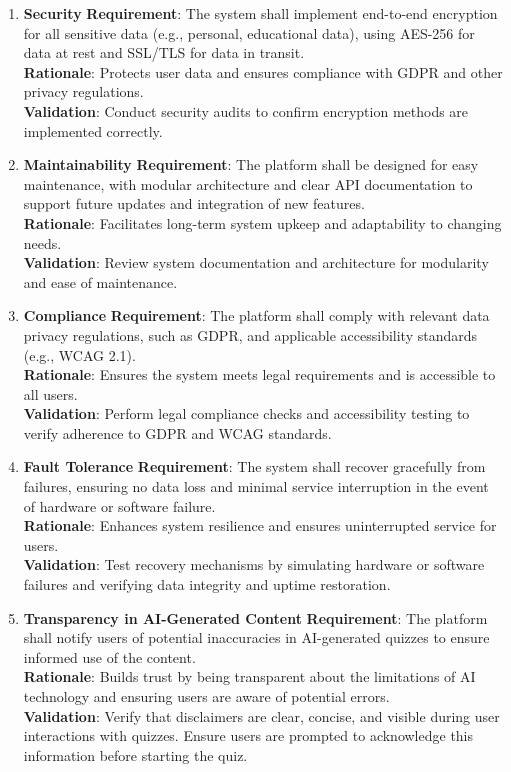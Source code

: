 \documentclass[12pt]{article}
\begin{document}
\begin{enumerate}
    \item \textbf{Security}  
    \textbf{Requirement}: The system shall implement end-to-end encryption for all sensitive data (e.g., personal, educational data), using AES-256 for data at rest and SSL/TLS for data in transit. \\
    \textbf{Rationale}: Protects user data and ensures compliance with GDPR and other privacy regulations. \\
    \textbf{Validation}: Conduct security audits to confirm encryption methods are implemented correctly.

    \item \textbf{Maintainability}  
    \textbf{Requirement}: The platform shall be designed for easy maintenance, with modular architecture and clear API documentation to support future updates and integration of new features. \\
    \textbf{Rationale}: Facilitates long-term system upkeep and adaptability to changing needs. \\
    \textbf{Validation}: Review system documentation and architecture for modularity and ease of maintenance.

    \item \textbf{Compliance}  
    \textbf{Requirement}: The platform shall comply with relevant data privacy regulations, such as GDPR, and applicable accessibility standards (e.g., WCAG 2.1). \\
    \textbf{Rationale}: Ensures the system meets legal requirements and is accessible to all users. \\
    \textbf{Validation}: Perform legal compliance checks and accessibility testing to verify adherence to GDPR and WCAG standards.

    \item \textbf{Fault Tolerance}  
    \textbf{Requirement}: The system shall recover gracefully from failures, ensuring no data loss and minimal service interruption in the event of hardware or software failure. \\
    \textbf{Rationale}: Enhances system resilience and ensures uninterrupted service for users. \\
    \textbf{Validation}: Test recovery mechanisms by simulating hardware or software failures and verifying data integrity and uptime restoration.

    \item \textbf{Transparency in AI-Generated Content}  
    \textbf{Requirement}: The platform shall notify users of potential inaccuracies in AI-generated quizzes to ensure informed use of the content. \\
    \textbf{Rationale}: Builds trust by being transparent about the limitations of AI technology and ensuring users are aware of potential errors. \\
    \textbf{Validation}: Verify that disclaimers are clear, concise, and visible during user interactions with quizzes. Ensure users are prompted to acknowledge this information before starting the quiz.

\end{enumerate}
\end{document}
